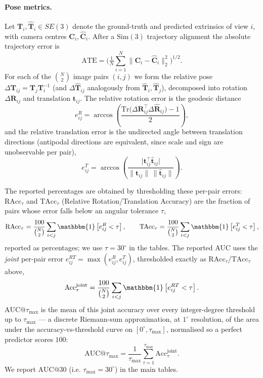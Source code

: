 \paragraph{Pose metrics.}
Let $\mathbf{T}_i, \hat{\mathbf{T}}_i \in SE(3)$ denote the
ground-truth and predicted extrinsics of view $i$, with camera
centres $\mathbf{C}_i, \hat{\mathbf{C}}_i$. After a $\mathrm{Sim}(3)$
trajectory alignment the absolute
trajectory error is
%
\begin{equation}
\mathrm{ATE} = \Big(\tfrac{1}{N}\textstyle\sum_{i=1}^{N}
\big\|\mathbf{C}_i - \hat{\mathbf{C}}_i\big\|_2^2\Big)^{1/2}.
\end{equation}
%
For each of the $\binom{N}{2}$ image pairs $(i,j)$ we form the
relative pose $\Delta\mathbf{T}_{ij} = \mathbf{T}_j\mathbf{T}_i^{-1}$
(and $\Delta\hat{\mathbf{T}}_{ij}$ analogously from
$\hat{\mathbf{T}}_i,\hat{\mathbf{T}}_j$), decomposed into rotation
$\Delta\mathbf{R}_{ij}$ and translation $\mathbf{t}_{ij}$. The
relative rotation error is the geodesic distance
%
\begin{equation}
e^{R}_{ij} = \arccos\!\left(\frac{\mathrm{Tr}\big(\Delta\mathbf{R}_{ij}^{\top}\Delta\hat{\mathbf{R}}_{ij}\big) - 1}{2}\right),
\end{equation}
%
and the relative translation error is the undirected angle between
translation directions (antipodal directions are equivalent, since
scale and sign are unobservable per pair),
%
\begin{equation}
e^{T}_{ij} = \arccos\!\left(\frac{\big|\mathbf{t}_{ij}^{\top}\hat{\mathbf{t}}_{ij}\big|}{\|\mathbf{t}_{ij}\|\,\|\hat{\mathbf{t}}_{ij}\|}\right).
\end{equation}
%

The reported percentages are obtained by thresholding these per-pair errors: $\mathrm{RAcc}_{\tau}$ and $\mathrm{TAcc}_{\tau}$ (Relative Rotation/Translation Accuracy) are the fraction of pairs whose error falls below an angular tolerance $\tau$,
$$\mathrm{RAcc}_{\tau} = \frac{100}{\binom{N}{2}}\sum_{i<j} \mathbbm{1}\left[e^{R}_{ij} < \tau\right], \qquad \mathrm{TAcc}_{\tau} = \frac{100}{\binom{N}{2}}\sum_{i<j} \mathbbm{1}\left[e^{T}_{ij} < \tau\right],$$
reported as percentages; we use $\tau=30^{\circ}$ in the  tables.
The reported AUC uses the \emph{joint} per-pair error
$e^{RT}_{ij} = \max\!\left(e^{R}_{ij}, e^{T}_{ij}\right)$, thresholded
exactly as $\mathrm{RAcc}_\tau$/$\mathrm{TAcc}_\tau$ above,
%
\begin{equation}
\mathrm{Acc}^{\mathrm{joint}}_\tau = \frac{100}{\binom{N}{2}}\sum_{i<j}
\mathbbm{1}\left[e^{RT}_{ij} < \tau\right].
\end{equation}
%
$\mathrm{AUC@}\tau_{\max}$ is the mean of this joint accuracy over
every integer-degree threshold up to $\tau_{\max}$ — a discrete
Riemann-sum approximation, at $1^{\circ}$ resolution, of the area
under the accuracy-vs-threshold curve on $[0^{\circ}, \tau_{\max}]$,
normalised so a perfect predictor scores $100$:
%
\begin{equation}
\mathrm{AUC@}\tau_{\max} = \frac{1}{\tau_{\max}}
\sum_{\tau=1}^{\tau_{\max}} \mathrm{Acc}^{\mathrm{joint}}_\tau .
\end{equation}
%
We report $\mathrm{AUC@30}$ (i.e. $\tau_{\max}=30^{\circ}$) in the
main tables.

